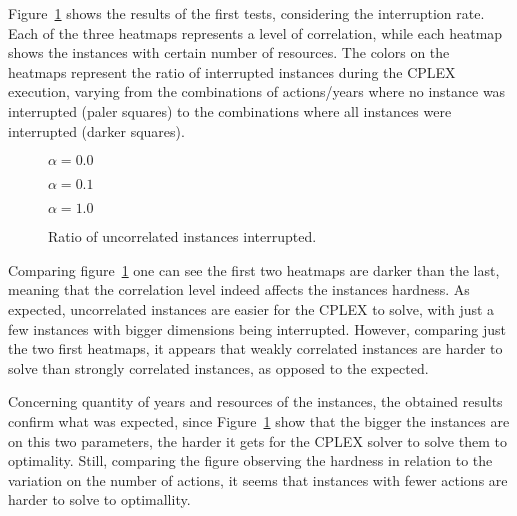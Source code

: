 Figure~\ref{fig:result10} shows the results of the first tests, 
considering the interruption rate. Each of the three heatmaps represents a level of correlation, while each heatmap 
shows the instances with certain number of resources. The colors on the heatmaps represent the ratio of interrupted 
instances during the CPLEX execution, varying from the combinations of actions/years where no instance was interrupted 
(paler squares) to the combinations where all instances were interrupted (darker squares).

\figpar
\begin{figure}[H]
  \centering
  \resizebox{\columnwidth}{!}{%
    \subfloat[1 resource]{}
    \subfloat[2 resources]{}
    \subfloat[4 resources]{}
  }
  $\alpha = 0.0$
\end{figure}

\figspaces
\begin{figure}[H]
  \centering
  \resizebox{\columnwidth}{!}{%
    \subfloat[1 resource]{}
    \subfloat[2 resources]{}
    \subfloat[4 resources]{}
  }
  $\alpha = 0.1$
\end{figure}

\figspaces
\begin{figure}[H]
  \centering
  \resizebox{\columnwidth}{!}{%
    \subfloat[1 resource]{}
    \subfloat[2 resources]{}
    \subfloat[4 resources]{}
  }
  $\alpha = 1.0$
  \caption{Ratio of uncorrelated instances interrupted.}
  \label{fig:result10}
\end{figure}

Comparing figure~\ref{fig:result10} one can see the first two heatmaps are darker 
than the last, meaning that the correlation level indeed affects the instances hardness. As expected, uncorrelated instances
are easier for the CPLEX to solve, with just a few instances with bigger dimensions being interrupted. However, comparing just
the two first heatmaps, it appears that weakly correlated instances are harder to solve than
strongly correlated instances, as opposed to the expected.

Concerning quantity of years and resources of the instances, the obtained results confirm what was expected, since 
Figure~\ref{fig:result10}
show that the bigger the instances are on this two parameters, the harder it gets for the CPLEX solver to solve them to optimality. 
Still, comparing the figure observing the hardness in relation to the variation on the number of actions, it seems that instances with fewer actions are 
harder to solve to optimallity.

